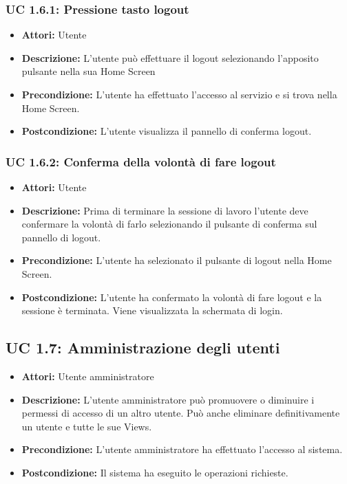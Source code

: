 \subsubsection{UC 1.6.1: Pressione tasto logout}

\begin{itemize}
\item \textbf{Attori:} Utente
\item \textbf{Descrizione:} L'utente può effettuare il logout selezionando l'apposito pulsante nella sua Home Screen
\item \textbf{Precondizione:} L'utente ha effettuato l'accesso al servizio e si trova nella Home Screen.
\item \textbf{Postcondizione:} L'utente visualizza il pannello di conferma logout.
\end{itemize}

\subsubsection{UC 1.6.2: Conferma della volontà di fare logout}

\begin{itemize}
\item \textbf{Attori:} Utente
\item \textbf{Descrizione:} Prima di terminare la sessione di lavoro l'utente deve confermare la volontà di farlo selezionando il pulsante di conferma sul pannello di logout.
\item \textbf{Precondizione:} L'utente ha selezionato il pulsante di logout nella Home Screen.
\item \textbf{Postcondizione:} L'utente ha confermato la volontà di fare logout e la sessione è terminata. Viene visualizzata la schermata di login.
\end{itemize}



\subsection{UC 1.7: Amministrazione degli utenti}

\begin{itemize}
\item \textbf{Attori:} Utente amministratore
\item \textbf{Descrizione:} L'utente amministratore può promuovere o diminuire i permessi di accesso di un altro utente. Può anche eliminare definitivamente un utente e tutte le sue Views.
\item \textbf{Precondizione:} L'utente amministratore ha effettuato l'accesso al sistema.
\item \textbf{Postcondizione:} Il sistema ha eseguito le operazioni richieste.
\end{itemize}


